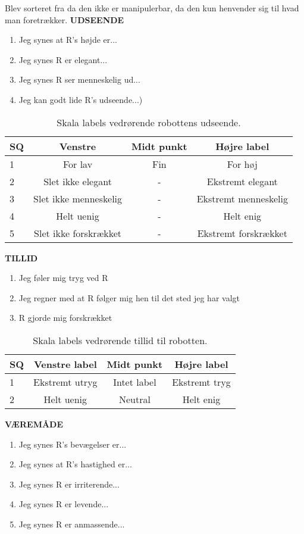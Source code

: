 Blev sorteret fra da den ikke er manipulerbar, da den kun henvender sig til hvad man foretrækker. \blankline
%
\textbf{UDSEENDE}
%
\begin{enumerate}
  \item Jeg synes at R's højde er...
  \item Jeg synes R er elegant...
  \item Jeg synes R ser menneskelig ud...
  \item Jeg kan godt lide R's udseende...)\blankline
\end{enumerate}
%
\begin{table}[H]
	\centering
	\begin{tabular}{l|c|c|c}
		SQ     & Venstre & Midt punkt & Højre label \\\hline
		1   & For lav  & Fin & For høj        \\\hline
		2   & Slet ikke elegant & - & Ekstremt elegant         \\\hline
		3   & Slet ikke menneskelig & - & Ekstremt menneskelig         \\\hline
	 	4   & Helt uenig & - & Helt enig         \\\hline
		5   & Slet ikke forskrækket & -  & Ekstremt forskrækket           
	\end{tabular}  
	\caption{Skala labels vedrørende robottens udseende.}
	\label{tab:UdseendeSkala}       
\end{table}
\noindent
%
\textbf{TILLID}
%
\begin{enumerate}
  \item Jeg føler mig tryg ved R
  \item Jeg regner med at R følger mig hen til det sted jeg har valgt
  \item R gjorde mig forskrækket\blankline
\end{enumerate}
%
\begin{table}[H]
	\centering 
	\begin{tabular}{l|c|c|c}
		SQ  & Venstre label & Midt punkt & Højre label \\\hline
		1   & Ekstremt utryg & Intet label & Ekstremt tryg  \\\hline
		2   & Helt uenig & Neutral & Helt enig 
	\end{tabular} 
	\caption{Skala labels vedrørende tillid til robotten.}
	\label{tab:TillidSkala}       
\end{table}
\noindent
%
\textbf{VÆREMÅDE}
%
\begin{enumerate}
  \item Jeg synes R's bevægelser er...
  \item Jeg synes at R's hastighed er...
  \item Jeg synes R er irriterende...
  \item Jeg synes R er levende...
  \item Jeg synes R er anmassende...\blankline
\end{enumerate}
